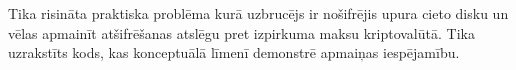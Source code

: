 Tika risināta praktiska problēma kurā uzbrucējs ir nošifrējis upura cieto disku un vēlas apmainīt atšifrēšanas atslēgu pret izpirkuma maksu kriptovalūtā. Tika uzrakstīts kods, kas konceptuālā līmenī demonstrē apmaiņas iespējamību.
